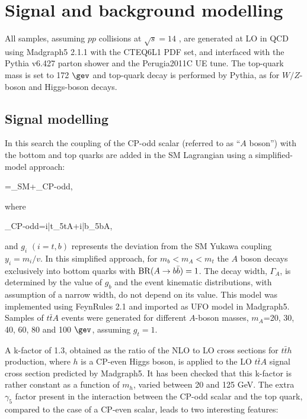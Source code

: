 \section{Signal and background modelling}
All samples, assuming $pp$ collisions at $\sqrt{s}=14$ \tev, are generated at LO in QCD using {\sc Madgraph5} 2.1.1 with the CTEQ6L1 PDF set, and interfaced with the {\sc Pythia} v6.427 parton shower and the Perugia2011C UE tune. The top-quark mass is set to 172 $\gev$ and top-quark decay is performed by {\sc Pythia}, as for $W/Z$-boson and Higgs-boson decays. 
  
\subsection{Signal modelling}

In this search the coupling of the CP-odd scalar (referred to as ``$A$ boson'') with the bottom and top quarks are added in the SM Lagrangian using a simplified-model approach:

\be
{}=_{\rm SM}+_{\rm CP-odd},
\ee

\noindent where

\be
{}_{CP-odd}=i\bar{t}\gamma_{5}tA+i\bar{b}\gamma_{5}bA,
\ee
 
\noindent and $g_{i}$ $(i=t,b)$ represents the deviation from the SM Yukawa coupling $y_{i}=m_{i}/v$. In this simplified approach, for $m_{b}<m_{A}<m_{t}$ the $A$ boson decays exclusively into bottom quarks with ${\rm BR}(A\to b\bar{b})=1$. The decay width, $\Gamma_{A}$, is determined by the value of $g_{b}$ and the event kinematic distributions, with assumption of a narrow width, do not depend on its value.
This model was implemented using {\sc FeynRules} 2.1 \cite{Alloul:2013bka} and imported as UFO model in {\sc Madgraph5}. Samples of $t\bar{t}A$ events were generated for different $A$-boson masses, $m_{A}$=20, 30, 40, 60, 80 and 100 $\gev$, assuming $g_{t}=1$. \par
A k-factor of 1.3,  obtained as the ratio of the NLO to LO cross sections for $t\bar{t}h$ production, where $h$ is a CP-even Higgs boson, is applied to the LO $t\bar{t}A$ signal cross section predicted by {\sc Madgraph5}. It has been checked that this k-factor is rather constant as a function of $m_{h}$, varied between 20 and 125 GeV.
The extra $\gamma_{5}$ factor present in the interaction between the CP-odd scalar and the top quark, compared to the case of a CP-even scalar, leads to two interesting features:

